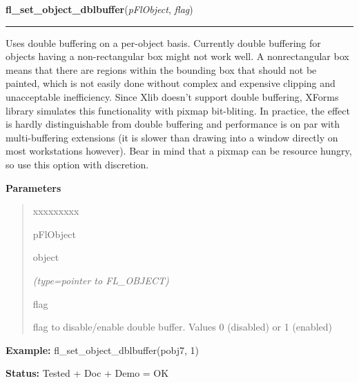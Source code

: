 \hspace{.8\funcindent}\begin{boxedminipage}{\funcwidth}

    \raggedright \textbf{fl\_set\_object\_dblbuffer}(\textit{pFlObject}, \textit{flag})

    \vspace{-1.5ex}

    \rule{\textwidth}{0.5\fboxrule}
\setlength{\parskip}{2ex}
    Uses double buffering on a per-object basis. Currently double buffering
    for objects having a non-rectangular box might not work well. A 
    nonrectangular box means that there are regions within the bounding box
    that should not be painted, which is not easily done without complex 
    and expensive clipping and unacceptable inefficiency. Since Xlib 
    doesn't support double buffering, XForms library simulates this 
    functionality with pixmap bit-bliting. In practice, the effect is 
    hardly distinguishable from double buffering and performance is on par 
    with multi-buffering extensions (it is slower than drawing into a 
    window directly on most workstations however). Bear in mind that a 
    pixmap can be resource hungry, so use this option with discretion.

\setlength{\parskip}{1ex}
      \textbf{Parameters}
      \vspace{-1ex}

      \begin{quote}
        \begin{Ventry}{xxxxxxxxx}

          \item[pFlObject]

          object

            {\it (type=pointer to FL\_OBJECT)}

          \item[flag]

          flag to disable/enable double buffer. Values 0 (disabled) or 1 
          (enabled)

        \end{Ventry}

      \end{quote}

\textbf{Example:} fl\_set\_object\_dblbuffer(pobj7, 1)



\textbf{Status:} Tested + Doc + Demo = OK



    \end{boxedminipage}

